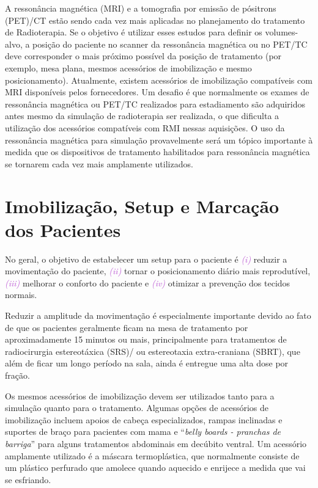 \documentclass[11pt,a4paper]{article}
\newcounter{exemplo}
\begin{document}
	A ressonância magnética (MRI) e a tomografia por emissão de pósitrons (PET)/CT estão sendo cada vez mais aplicadas no planejamento do tratamento de Radioterapia. Se o objetivo é utilizar esses estudos para definir os volumes-alvo, a posição do paciente no scanner da ressonância magnética ou no PET/TC deve corresponder o mais próximo possível da posição de tratamento (por exemplo, mesa plana, mesmos acessórios de imobilização e mesmo posicionamento). Atualmente, existem acessórios de imobilização compatíveis com MRI disponíveis pelos fornecedores. Um desafio é que normalmente os exames de ressonância magnética ou PET/TC realizados para estadiamento são adquiridos antes mesmo da simulação de radioterapia ser realizada, o que dificulta a utilização dos acessórios compatíveis com RMI nessas aquisições. O uso da ressonância magnética para simulação provavelmente será um tópico importante à medida que os dispositivos de tratamento habilitados para ressonância magnética se tornarem cada vez mais amplamente utilizados.

\section{Imobilização, Setup e Marcação dos Pacientes}

	No geral, o objetivo de estabelecer um setup para o paciente é \textit{\textcolor{MediumOrchid}{(i)}} reduzir a movimentação do paciente, \textit{\textcolor{MediumOrchid}{(ii)}} tornar o posicionamento diário mais reprodutível, \textit{\textcolor{MediumOrchid}{(iii)}}  melhorar o conforto do paciente e \textit{\textcolor{MediumOrchid}{(iv)}} otimizar a prevenção dos tecidos normais.

	Reduzir a amplitude da movimentação é especialmente importante devido ao fato de que os pacientes geralmente ficam na mesa de tratamento por aproximadamente 15 minutos ou mais, principalmente para tratamentos de radiocirurgia estereotáxica (SRS)/ ou estereotaxia extra-craniana (SBRT), que além de ficar um longo período na sala, ainda é entregue uma alta dose por fração. 
	
	Os mesmos acessórios de imobilização devem ser utilizados tanto para a simulação quanto para o tratamento. Algumas opções de acessórios de imobilização incluem apoios de cabeça especializados, rampas inclinadas e suportes de braço para pacientes com mama e “\textit{belly boards - pranchas de barriga}”  para alguns tratamentos abdominais em decúbito ventral. Um acessório amplamente utilizado é a máscara termoplástica, que normalmente consiste de um plástico perfurado que amolece quando aquecido e enrijece a medida que vai se esfriando. 
	
\end{document}
